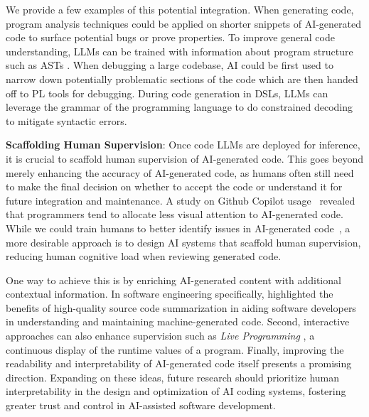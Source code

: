 We provide a few examples of this potential integration. When generating code, program analysis techniques could be applied on shorter snippets of AI-generated code to surface potential bugs or prove properties. To improve general code understanding, LLMs can be trained with information about program structure such as ASTs \citep{gong2024ast}. When debugging a large codebase, AI could be first used to narrow down potentially problematic sections of the code which are then handed off to PL tools for debugging. During code generation in DSLs, LLMs can leverage the grammar of the programming language to do constrained decoding~\citep{poesia2022synchromesh, geng2023grammar, wei2023copiloting} to mitigate syntactic errors.

\textbf{Scaffolding Human Supervision}: Once code LLMs are deployed for inference, it is crucial to scaffold human supervision of AI-generated code. This goes beyond merely enhancing the accuracy of AI-generated code, as humans often still need to make the final decision on whether to accept the code or understand it for future integration and maintenance. A study on Github Copilot usage~\citep{10.1145/3551349.3560438} revealed that programmers tend to allocate less visual attention to AI-generated code. %
While we could train humans to better identify issues in AI-generated code~\citep{10.1145/3627217.3627238}, a more desirable approach is to design AI systems that scaffold human supervision, reducing human cognitive load when reviewing generated code.

One way to achieve this is by enriching AI-generated content with additional contextual information. In software engineering specifically, \citet{sun2024source} highlighted the benefits of high-quality source code summarization in aiding software developers in understanding and maintaining machine-generated code. Second, interactive approaches can also enhance supervision such as \textit{Live Programming} \citep{ferdowsi2024validating}, a continuous display of the runtime values of a program. Finally, improving the readability and interpretability of AI-generated code itself presents a promising direction. Expanding on these ideas, future research should prioritize human interpretability in the design and optimization of AI coding systems, fostering greater trust and control in AI-assisted software development.
